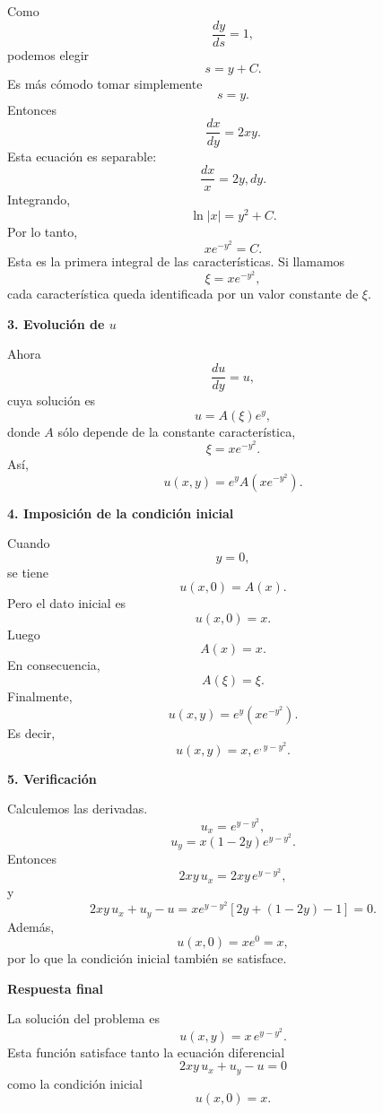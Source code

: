 \documentclass[11pt,spanish]{article}
\newcounter{problema}
\begin{document}
Como
$$
\frac{dy}{ds}=1,
$$
podemos elegir
$$
s=y+C.
$$
Es más cómodo tomar simplemente
$$
\boxed{s=y.}
$$
Entonces
$$
\frac{dx}{dy}=2xy.
$$
Esta ecuación es separable:
$$
\frac{dx}{x}=2y,dy.
$$
Integrando,
$$
\ln|x|=y^2+C.
$$
Por lo tanto,
$$
\boxed{
xe^{-y^2}=C.
}
$$
Esta es la primera integral de las características.
Si llamamos
$$
\xi=xe^{-y^2},
$$
cada característica queda identificada por un valor constante de $\xi$.

{\bf 3. Evolución de $u$}

Ahora
$$
\frac{du}{dy}=u,
$$
cuya solución es
$$
u=A(\xi)e^y,
$$
donde $A$ sólo depende de la constante característica,
$$
\xi=xe^{-y^2}.
$$
Así,
$$
\boxed{
u(x,y)
=
e^y
A\left(xe^{-y^2}\right).
}
$$

{\bf 4. Imposición de la condición inicial}

Cuando
$$
y=0,
$$
se tiene
$$
u(x,0)=A(x).
$$
Pero el dato inicial es
$$
u(x,0)=x.
$$
Luego
$$
A(x)=x.
$$
En consecuencia,
$$
A(\xi)=\xi.
$$
Finalmente,
$$
u(x,y)
=
e^y
\left(xe^{-y^2}\right).
$$
Es decir,
$$
\boxed{
u(x,y)
=
x,e^{,y-y^2}.
}
$$

{\bf 5. Verificación}

Calculemos las derivadas.
$$
u_x=e^{y-y^2},
$$
$$
u_y
=
x(1-2y)e^{y-y^2}.
$$
Entonces
$$
2xy\,u_x
=
2xy\,e^{y-y^2},
$$
y
$$
2xy\,u_x+u_y-u
=
xe^{y-y^2}
\left[
2y+(1-2y)-1
\right]
=0.
$$
Además,
$$
u(x,0)=xe^0=x,
$$
por lo que la condición inicial también se satisface.

{\bf Respuesta final}

La solución del problema es
$$
\boxed{
u(x,y)=x\,e^{y-y^2}.
}
$$
Esta función satisface tanto la ecuación diferencial
$$
2xy\,u_x+u_y-u=0
$$
como la condición inicial
$$
u(x,0)=x.
$$
\end{document}
